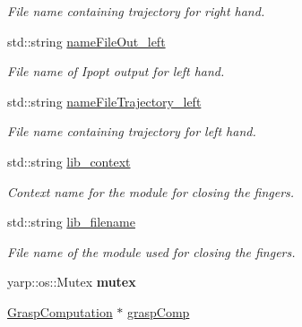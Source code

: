\begin{DoxyCompactItemize}
\begin{DoxyCompactList}\small\item\em File name containing trajectory for right hand. \end{DoxyCompactList}\item 
std\+::string \hyperlink{classGraspingModule_a3d16b71a4e021206b2b60dca65b6bf88}{name\+File\+Out\+\_\+left}\label{classGraspingModule_a3d16b71a4e021206b2b60dca65b6bf88}

\begin{DoxyCompactList}\small\item\em File name of Ipopt output for left hand. \end{DoxyCompactList}\item 
std\+::string \hyperlink{classGraspingModule_a1f3841076509b5140edbdb7d01aa3f4b}{name\+File\+Trajectory\+\_\+left}\label{classGraspingModule_a1f3841076509b5140edbdb7d01aa3f4b}

\begin{DoxyCompactList}\small\item\em File name containing trajectory for left hand. \end{DoxyCompactList}\item 
std\+::string \hyperlink{classGraspingModule_a7d96e2271d553a340888ffa1a422d608}{lib\+\_\+context}\label{classGraspingModule_a7d96e2271d553a340888ffa1a422d608}

\begin{DoxyCompactList}\small\item\em Context name for the module for closing the fingers. \end{DoxyCompactList}\item 
std\+::string \hyperlink{classGraspingModule_a437d621f1b6e1ce0d5cc1d8958b53fee}{lib\+\_\+filename}\label{classGraspingModule_a437d621f1b6e1ce0d5cc1d8958b53fee}

\begin{DoxyCompactList}\small\item\em File name of the module used for closing the fingers. \end{DoxyCompactList}\item 
yarp\+::os\+::\+Mutex {\bfseries mutex}\label{classGraspingModule_ae27bf275f6a5f99728586ae235477683}

\item 
\hyperlink{classGraspComputation}{Grasp\+Computation} $\ast$ \hyperlink{classGraspingModule_a2a88d576e1cc46c209d6ff40657f1ddb}{grasp\+Comp}\label{classGraspingModule_a2a88d576e1cc46c209d6ff40657f1ddb}


\end{DoxyCompactItemize}

